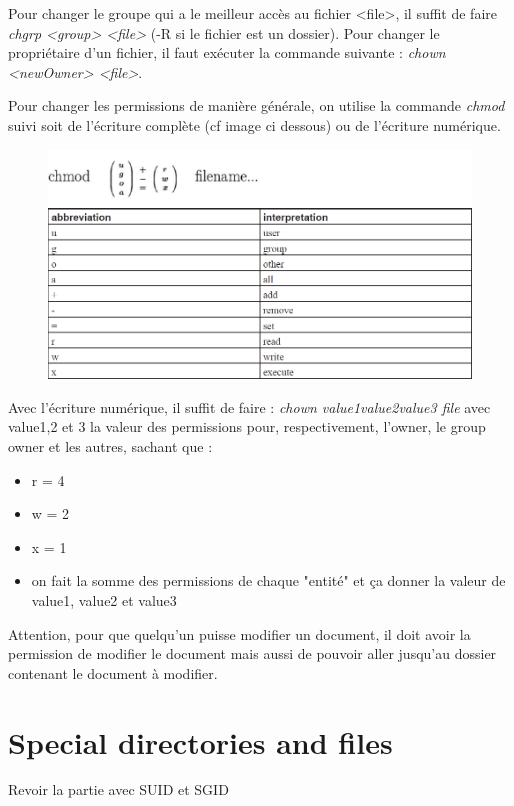 \documentclass{article}
\begin{document}
\noindent Pour changer le groupe qui a le meilleur accès au fichier <file>, il suffit de faire \textit{chgrp <group> <file>} (-R si le fichier est un dossier).\newline
Pour changer le propriétaire d'un fichier, il faut exécuter la commande suivante : \textit{chown <newOwner> <file>}.

Pour changer les permissions de manière générale, on utilise la commande \textit{chmod} suivi soit de l'écriture complète (cf image ci dessous) ou de l'écriture numérique.
\begin{figure}[h]
    \centering
    \includegraphics[scale=0.3]{Images/Permissions.png}
\end{figure}

Avec l'écriture numérique, il suffit de faire : \textit{chown value1value2value3 file} avec value1,2 et 3 la valeur des permissions pour, respectivement, l'owner, le group owner et les autres, sachant que :
\begin{itemize}
    \item r = 4
    \item w = 2
    \item x = 1
    \item on fait la somme des permissions de chaque "entité" et ça donner la valeur de value1, value2 et value3
\end{itemize}

\noindent Attention, pour que quelqu'un puisse modifier un document, il doit avoir la permission de modifier le document mais aussi de pouvoir aller jusqu'au dossier contenant le document à modifier.

\newpage
\section{Special directories and files}
Revoir la partie avec SUID et SGID
\end{document}

